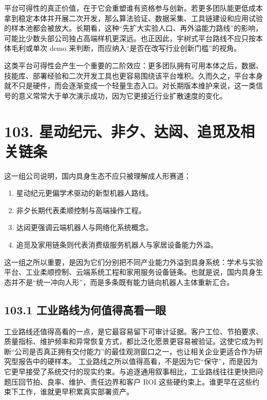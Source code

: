 平台可得性的真正价值，在于它会重塑谁有资格参与创新。若更多团队能更低成本拿到稳定本体并开展二次开发，那么算法验证、数据采集、工具链建设和应用试验的样本池都会被放大。长期看，这种“先扩大实验人口、再外溢能力路线”的影响，可能比少数头部公司独占高端样机更深远。也正因此，宇树式平台路线不应只按本体毛利或单次 demo 来判断，而应纳入“是否在改写行业创新门槛”的视角。

这类平台可得性会产生一个重要的二阶效应：更多团队拥有可用本体之后，数据、技能库、部署经验和二次开发工具也更容易围绕该平台堆积。久而久之，平台本身就不只是硬件，而会逐渐变成一个轻量生态入口。对长期版本维护来说，这一类信号的意义常常大于单次演示成功，因为它更接近行业扩散速度的变化。

\section*{103. 星动纪元、非夕、达闼、追觅及相关链条}

这一组公司说明，国内具身生态不应只被理解成人形赛道：

\begin{enumerate}
\item 星动纪元更偏学术驱动的新型机器人路线。
\item 非夕长期代表柔顺控制与高端操作工程。
\item 达闼更强调云端机器人与网络化系统概念。
\item 追觅及家用链条则代表消费级服务机器人与家居设备能力外溢。
\end{enumerate}

这一组之所以重要，是因为它们分别把不同产业能力外溢到具身系统：学术与实验平台、工业柔顺控制、云端系统工程和家用服务设备链条。也就是说，国内具身生态并不是“统一冲向人形”，而是多条既有能力链向机器人主体重新汇合。

\subsection*{103.1 工业路线为何值得高看一眼}


工业路线还值得高看的一点，是它最容易留下可审计证据。客户工位、节拍要求、质量指标、维护频率和异常恢复方式，都比泛化愿景更容易被验证。这使它成为判断“公司是否真正拥有交付能力”的最佳观测窗口之一，也让相关企业更适合作为研究型报告中的硬样本。 工业路线之所以值得高看，不是因为它“保守”，而是因为它更早接受了系统交付的现实约束。与追逐通用叙事相比，工业路线往往更快把问题压回节拍、良率、维护、责任边界和客户 ROI 这些硬约束上。谁更早在这些约束下工作，谁就更早积累真实部署资产。

